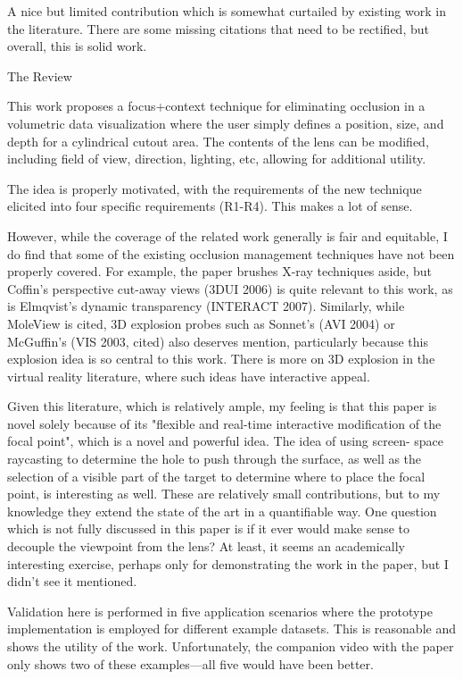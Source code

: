 \documentclass[a4paper,10pt]{article}
\begin{document}
A nice but limited contribution which is somewhat curtailed by existing work in
    the literature. There are some missing citations that need to be rectified, but
    overall, this is solid work.

  The Review

    This work proposes a focus+context technique for eliminating occlusion in a
    volumetric data visualization where the user simply defines a position, size, and
    depth for a cylindrical cutout area. The contents of the lens can be modified,
    including field of view, direction, lighting, etc, allowing for additional
    utility.

    The idea is properly motivated, with the requirements of the new technique
    elicited into four specific requirements (R1-R4). This makes a lot of sense.

    However, while the coverage of the related work generally is fair and equitable, I
    do find that some of the existing occlusion management techniques have not been
    properly covered. For example, the paper brushes X-ray techniques aside, but
    Coffin's perspective cut-away views (3DUI 2006) is quite relevant to this work, as
    is Elmqvist's dynamic transparency (INTERACT 2007). Similarly, while MoleView is
    cited, 3D explosion probes such as Sonnet's (AVI 2004) or McGuffin's (VIS 2003,
    cited) also deserves mention, particularly because this explosion idea is so
    central to this work. There is more on 3D explosion in the virtual reality
    literature, where such ideas have interactive appeal.

    Given this literature, which is relatively ample, my feeling is that this paper is
    novel solely because of its "flexible and real-time interactive modification of
    the focal point", which is a novel and powerful idea. The idea of using screen-
    space raycasting to determine the hole to push through the surface, as well as the
    selection of a visible part of the target to determine where to place the focal
    point, is interesting as well. These are relatively small contributions, but to my
    knowledge they extend the state of the art in a quantifiable way. One question
    which is not fully discussed in this paper is if it ever would make sense to
    decouple the viewpoint from the lens? At least, it seems an academically
    interesting exercise, perhaps only for demonstrating the work in the paper, but I
    didn't see it mentioned.

    Validation here is performed in five application scenarios where the prototype
    implementation is employed for different example datasets. This is reasonable and
    shows the utility of the work. Unfortunately, the companion video with the paper
    only shows two of these examples---all five would have been better.
\end{document}
